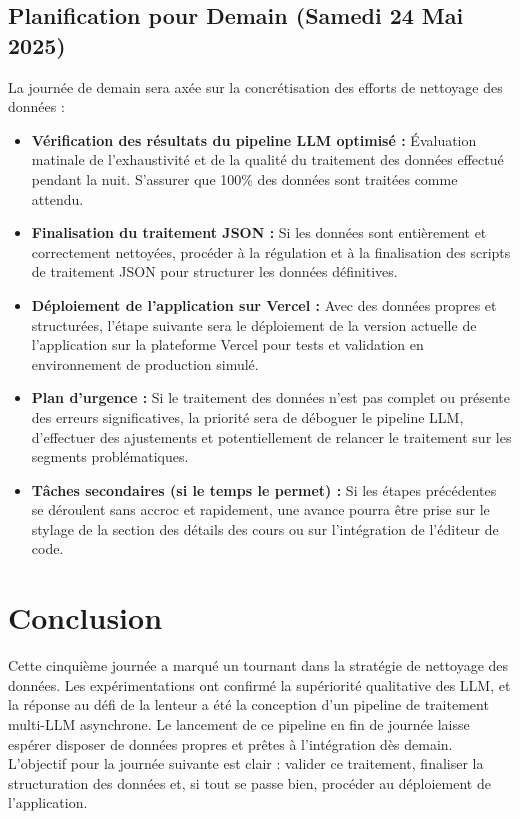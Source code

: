\documentclass[12pt, a4paper]{article}
\begin{document}
\subsection{Planification pour Demain (Samedi 24 Mai 2025)} %
La journée de demain sera axée sur la concrétisation des efforts de nettoyage des données :
\begin{itemize}
  \item \textbf{Vérification des résultats du pipeline LLM optimisé :} Évaluation matinale de l'exhaustivité et de la qualité du traitement des données effectué pendant la nuit. S'assurer que 100\% des données sont traitées comme attendu.
  \item \textbf{Finalisation du traitement JSON :} Si les données sont entièrement et correctement nettoyées, procéder à la régulation et à la finalisation des scripts de traitement JSON pour structurer les données définitives.
  \item \textbf{Déploiement de l'application sur Vercel :} Avec des données propres et structurées, l'étape suivante sera le déploiement de la version actuelle de l'application sur la plateforme Vercel pour tests et validation en environnement de production simulé.
  \item \textbf{Plan d'urgence :} Si le traitement des données n'est pas complet ou présente des erreurs significatives, la priorité sera de déboguer le pipeline LLM, d'effectuer des ajustements et potentiellement de relancer le traitement sur les segments problématiques.
  \item \textbf{Tâches secondaires (si le temps le permet) :} Si les étapes précédentes se déroulent sans accroc et rapidement, une avance pourra être prise sur le stylage de la section des détails des cours ou sur l'intégration de l'éditeur de code.
\end{itemize}

\section{Conclusion}
Cette cinquième journée a marqué un tournant dans la stratégie de nettoyage des données. Les expérimentations ont confirmé la supériorité qualitative des LLM, et la réponse au défi de la lenteur a été la conception d'un pipeline de traitement multi-LLM asynchrone. Le lancement de ce pipeline en fin de journée laisse espérer disposer de données propres et prêtes à l'intégration dès demain. L'objectif pour la journée suivante est clair : valider ce traitement, finaliser la structuration des données et, si tout se passe bien, procéder au déploiement de l'application.
\end{document}
